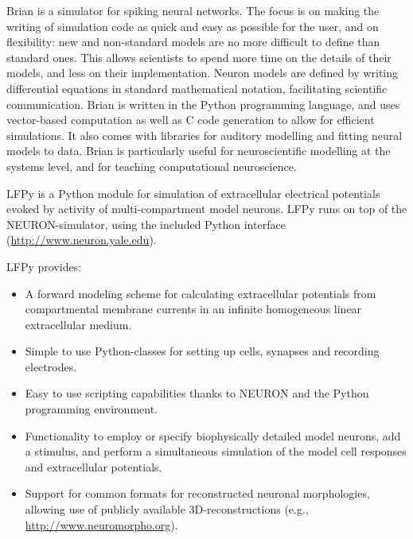 \begin{multicols}{3}

Brian is a simulator for spiking neural networks. The focus is on making the writing of simulation code as quick and easy as possible for the user, and on flexibility: new and non-standard models are no more difficult to define than standard ones. This allows scientists to spend more time on the details of their models, and less on their implementation. Neuron models are defined by writing differential equations in standard mathematical notation, facilitating scientific communication. Brian is written in the Python programming language, and uses vector-based computation as well as C code generation to allow for efficient simulations. It also comes with libraries for auditory modelling and fitting neural models to data. Brian is particularly useful for neuroscientific modelling at the systems level, and for teaching computational neuroscience.



LFPy is a Python module for simulation of extracellular electrical
potentials evoked by activity of multi-compartment model neurons.
LFPy runs on top of the NEURON-simulator, using the included Python interface
(\url{http://www.neuron.yale.edu}).

LFPy provides:
\begin{itemize}[nolistsep, topsep=0em, leftmargin=1pc]
\item A forward modeling scheme for calculating extracellular potentials from compartmental membrane currents in an infinite homogeneous linear extracellular medium.
\item Simple to use Python-classes for setting up cells, synapses and recording electrodes.
\item Easy to use scripting capabilities thanks to NEURON and the Python programming environment.
\item Functionality to employ or specify biophysically detailed model neurons, add a stimulus, and perform a simultaneous simulation of the model cell responses and extracellular potentials.
\item Support for common formats for reconstructed neuronal morphologies, allowing use of publicly available 3D-reconstructions (e.g., \url{http://www.neuromorpho.org}). 
\end{itemize}



\end{multicols}
